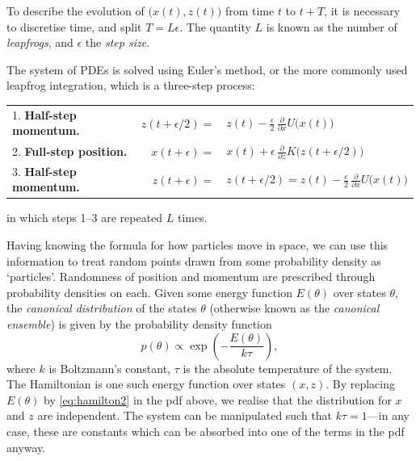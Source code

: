 To describe the evolution of $\big(x(t),z(t)\big)$ from time $t$ to $t+T$, it is necessary to discretise time, and split $T = L\epsilon$.
The quantity $L$ is known as the number of \emph{leapfrogs}, and $\epsilon$ the \emph{step size}.
\begin{center}
\end{center}
The system of PDEs is solved using Euler's method, or the more commonly used leapfrog integration, which is a three-step process:
\begin{table}[H]
  \centering
  \begin{tabular}{lrl}
    1. \textbf{Half-step momentum.} 
    &$z(t + \epsilon/2) =$ 
    &\hspace{-7pt}$z(t) - \frac{\epsilon}{2} \, \frac{\partial}{\partial x} U \big( x(t) \big)$ \\[0.6em]
    2. \textbf{Full-step position.} 
    &$x(t + \epsilon) =$ 
    &\hspace{-7pt}$x(t) + \epsilon \, \frac{\partial}{\partial  z} K \big(  z(t + \epsilon / 2) \big)$ \\[0.6em]
    3. \textbf{Half-step momentum.} 
    &$z(t + \epsilon) =$ 
    &\hspace{-7pt}$z(t + \epsilon/2) =  z(t) - \frac{\epsilon}{2} \, \frac{\partial}{\partial x} U \big( x(t) \big)$ \\[0.6em]
  \end{tabular}
\end{table}
\vspace{-1.5em}
\noindent in which steps 1--3 are repeated $L$ times.

Having knowing the formula for how particles move in space, we can use this information to treat random points drawn from some probability density as `particles'.
Randomness of position and momentum are prescribed through probability densities on each.
Given some energy function $E(\theta)$ over states $\theta$, the \emph{canonical distribution} of the states $\theta$ (otherwise known as the \emph{canonical ensemble}) is given by the probability density function
\[
  p(\theta) \propto \exp \left( -\frac{E(\theta)}{k\tau} \right),
\]
where $k$ is Boltzmann's constant, $\tau$ is the absolute temperature of the system.
The Hamiltonian is one such energy function over states $(x,z)$.
By replacing $E(\theta)$ by \cref{eq:hamilton2} in the pdf above, we realise that the distribution for $x$ and $z$ are independent.
The system can be manipulated such that $k\tau=1$---in any case, these are constants which can be absorbed into one of the terms in the pdf anyway.

